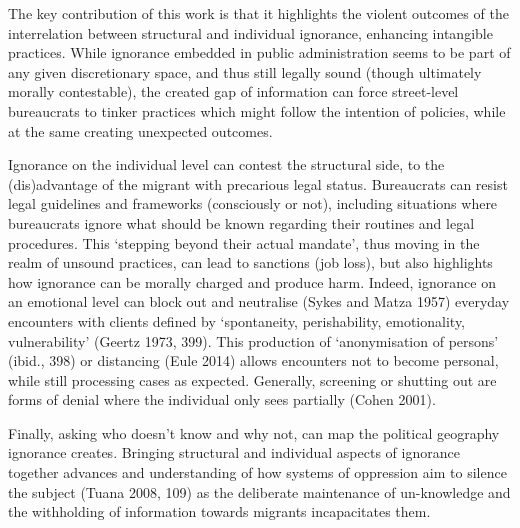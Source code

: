 \par
The key contribution of this work is that it highlights the violent outcomes of the interrelation between structural and individual ignorance, enhancing intangible practices. While ignorance embedded in public administration seems to be part of any given discretionary space, and thus still legally sound (though ultimately morally contestable), the created gap of information can force street-level bureaucrats to tinker practices which might follow the intention of policies, while at the same creating unexpected outcomes.
\par
Ignorance on the individual level can contest the structural side, to the (dis)advantage of the migrant with precarious legal status. Bureaucrats can resist legal guidelines and frameworks (consciously or not), including situations where bureaucrats ignore what should be known regarding their routines and legal procedures. This ‘stepping beyond their actual mandate’, thus moving in the realm of unsound practices, can lead to sanctions (job loss), but also highlights how ignorance can be morally charged and produce harm. Indeed, ignorance on an emotional level can block out and neutralise (Sykes and Matza 1957) everyday encounters with clients defined by ‘spontaneity, perishability, emotionality, vulnerability’ (Geertz 1973, 399). This production of ‘anonymisation of persons’ (ibid., 398) or distancing (Eule 2014) allows encounters not to become personal, while still processing cases as expected. Generally,  screening or shutting out are forms of denial where the individual only sees partially (Cohen 2001). 
\par
Finally, asking who doesn’t know and why not, can map the political geography ignorance creates. Bringing structural and individual aspects of ignorance together advances and understanding of how systems of oppression aim to silence the subject (Tuana 2008, 109) as the deliberate maintenance of un-knowledge and the withholding of information towards migrants incapacitates them.

